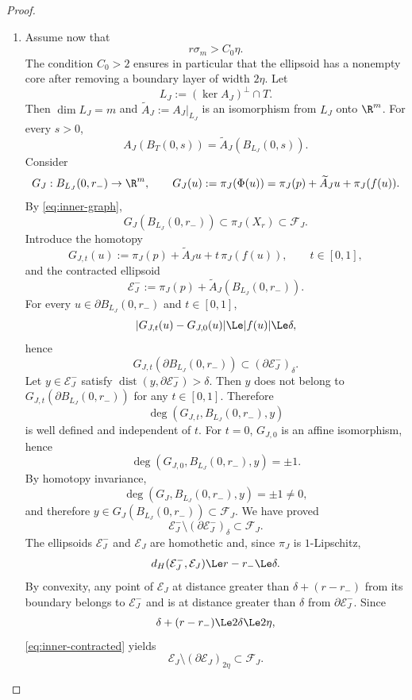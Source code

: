 \begin{proof}
\begin{enumerate}
\item Assume now that
\[
 r\sigma_m>C_0\eta.
\]
The condition $C_0>2$ ensures in particular that the ellipsoid has a
nonempty core after removing a boundary layer of width $2\eta$.
Let
\[
 L_J:=(\ker A_J)^\perp\cap T.
\]
Then $\dim L_J=m$ and
$\widetilde A_J:=A_J|_{L_J}$ is an isomorphism from $L_J$ onto
$\R^m$. For every $s>0$,
\[
 A_J(B_T(0,s))=\widetilde A_J(B_{L_J}(0,s)).
\]
Consider
\[
 G_J:B_{L_J}(0,r_-)\to\R^m,
 \qquad
 G_J(u):=\pi_J(\Phi(u))
 =\pi_J(p)+\widetilde A_Ju+\pi_J(f(u)).
\]
By \eqref{eq:inner-graph},
\begin{equation}
\label{eq:G-image}
 G_J(B_{L_J}(0,r_-))\subset\pi_J(X_r)\subset\mathcal F_J.
\end{equation}
Introduce the homotopy
\[
 G_{J,t}(u):=\pi_J(p)+\widetilde A_Ju+t\,\pi_J(f(u)),
 \qquad t\in[0,1],
\]
and the contracted ellipsoid
\[
 \mathcal E_J^-:=\pi_J(p)+\widetilde A_J(B_{L_J}(0,r_-)).
\]
For every $u\in\partial B_{L_J}(0,r_-)$ and $t\in[0,1]$,
\[
 |G_{J,t}(u)-G_{J,0}(u)|\Le |f(u)|\Le\delta,
\]
hence
\begin{equation}
\label{eq:homotopy-boundary}
 G_{J,t}(\partial B_{L_J}(0,r_-))
 \subset(\partial\mathcal E_J^-)_\delta.
\end{equation}
Let $y\in\mathcal E_J^-$ satisfy
$\operatorname{dist}(y,\partial\mathcal E_J^-)>\delta$. Then $y$
does not belong to
$G_{J,t}(\partial B_{L_J}(0,r_-))$ for any $t\in[0,1]$. Therefore
\[
 \deg(G_{J,t},B_{L_J}(0,r_-),y)
\]
is well defined and independent of $t$. For $t=0$, $G_{J,0}$ is an
affine isomorphism, hence
\[
 \deg(G_{J,0},B_{L_J}(0,r_-),y)=\pm1.
\]
By homotopy invariance,
\[
 \deg(G_J,B_{L_J}(0,r_-),y)=\pm1\ne0,
\]
and therefore $y\in G_J(B_{L_J}(0,r_-))\subset\mathcal F_J$. We have
proved
\begin{equation}
\label{eq:inner-contracted}
 \mathcal E_J^-\setminus(\partial\mathcal E_J^-)_\delta
 \subset\mathcal F_J.
\end{equation}
The ellipsoids $\mathcal E_J^-$ and $\mathcal E_J$ are homothetic and,
since $\pi_J$ is $1$-Lipschitz,
\[
 d_H(\mathcal E_J^-,\mathcal E_J)
 \Le r-r_-\Le\delta.
\]
By convexity, any point of $\mathcal E_J$ at distance greater than
$\delta+(r-r_-)$ from its boundary belongs to $\mathcal E_J^-$ and is
at distance greater than $\delta$ from $\partial\mathcal E_J^-$. Since
\[
 \delta+(r-r_-)\Le2\delta\Le2\eta,
\]
\eqref{eq:inner-contracted} yields
\begin{equation}
\label{eq:inner-final}
 \mathcal E_J\setminus(\partial\mathcal E_J)_{2\eta}
 \subset\mathcal F_J.
\end{equation}


\end{enumerate}
\end{proof}
